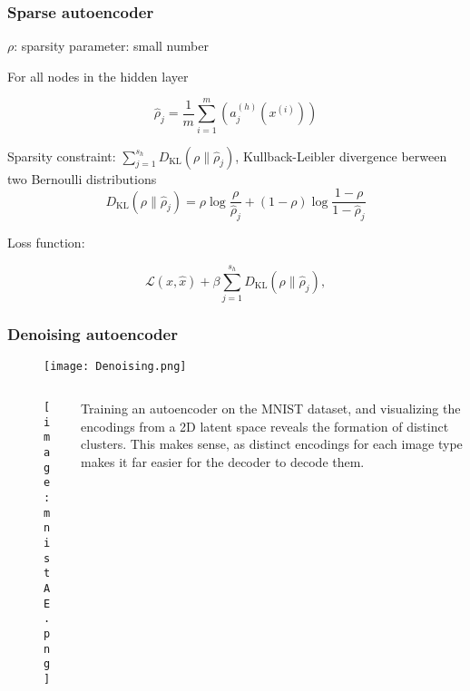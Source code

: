 \documentclass[t]{beamer}
\begin{document}
\begin{frame}
  \frametitle{Sparse autoencoder}

  $\rho$: sparsity parameter: small number

  \vspace{5pt}

  For all nodes in the hidden layer

  \[
    \hat{\rho}_j= \frac{1}{m}\sum_{i=1}^m (a_j^{(h)}(x^{(i)}))
  \]

  Sparsity constraint:
  $\sum_{j=1}^{s_h} D_{\text{KL}}(\rho \| \hat{\rho}_j)$,
  Kullback-Leibler divergence berween two Bernoulli
  distributions
  \[
  D_{\text{KL}}(\rho \| \hat{\rho}_j) = \rho \log \frac{\rho
  }{\hat{\rho}_j} + (1-\rho) \log \frac{1-\rho}{1-
    \hat{\rho}_j}
\]

Loss function:

\[
  \mathcal{L}(x, \hat{x})+ \beta \sum_{j=1}^{s_h}
  D_{\text{KL}}(\rho \| \hat{\rho}_j),
\]
\end{frame}

\begin{frame}
  \frametitle{Denoising autoencoder}

  \begin{figure}
    \texttt{[image: Denoising.png]}
  \end{figure}

\end{frame}

\begin{frame}

\begin{columns}

    \begin{column}{0.5\textwidth}
      \begin{figure}
        \texttt{[image: mnistAE.png]}
      \end{figure}
    \end{column}

    \begin{column}{0.5\textwidth}
      
      \vspace{15pt}
      
      Training an autoencoder on the MNIST dataset, and
      visualizing the encodings from a 2D latent space
      reveals the formation of distinct clusters. This makes
      sense, as distinct encodings for each image type makes
      it far easier for the decoder to decode them. 
    \end{column}
    
  \end{columns}
\end{frame}
\end{document}
